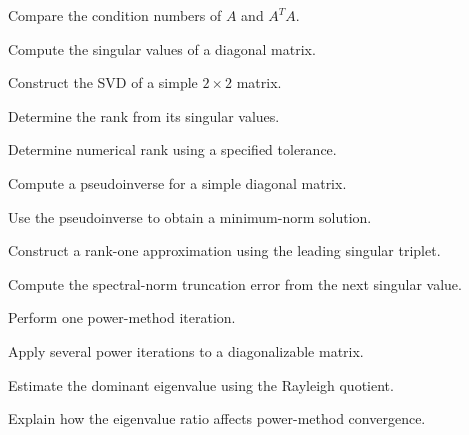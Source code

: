 \begin{exercise}[3]
Compare the condition numbers of \(A\) and \(A^TA\).
\end{exercise}

\begin{exercise}[2]
Compute the singular values of a diagonal matrix.
\end{exercise}

\begin{exercise}[3]
Construct the SVD of a simple \(2\times2\) matrix.
\end{exercise}

\begin{exercise}[3]
Determine the rank from its singular values.
\end{exercise}

\begin{exercise}[3]
Determine numerical rank using a specified tolerance.
\end{exercise}

\begin{exercise}[3]
Compute a pseudoinverse for a simple diagonal matrix.
\end{exercise}

\begin{exercise}[3]
Use the pseudoinverse to obtain a minimum-norm solution.
\end{exercise}

\begin{exercise}[3]
Construct a rank-one approximation using the leading singular triplet.
\end{exercise}

\begin{exercise}[3]
Compute the spectral-norm truncation error from the next singular value.
\end{exercise}

\begin{exercise}[2]
Perform one power-method iteration.
\end{exercise}

\begin{exercise}[3]
Apply several power iterations to a diagonalizable matrix.
\end{exercise}

\begin{exercise}[3]
Estimate the dominant eigenvalue using the Rayleigh quotient.
\end{exercise}

\begin{exercise}[3]
Explain how the eigenvalue ratio affects power-method convergence.
\end{exercise}

